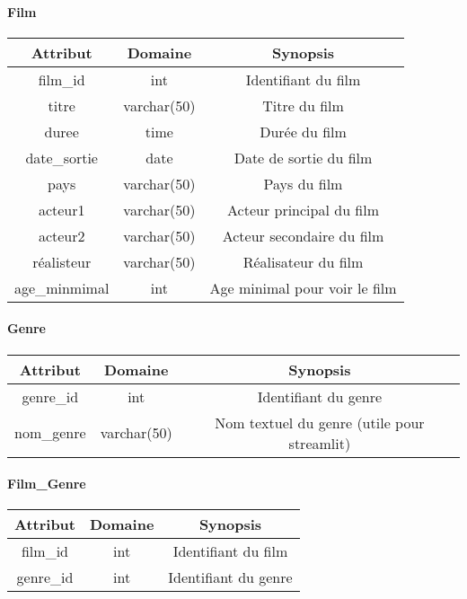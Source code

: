 \documentclass[12pt]{article}
\begin{document}
\paragraph*{Film}
\begin{center}
    \begin{tabular}{||c c c||} 
     \hline
     Attribut & Domaine & Synopsis\\ [0.5ex] 
     \hline\hline
     {\color{blue} film{\_}id} & int & Identifiant du film \\ 
     \hline
     titre & varchar(50) & Titre du film \\
     \hline
     duree & time & Durée du film \\
     \hline
     date{\_}sortie & date & Date de sortie du film \\
     \hline
     pays & varchar(50) & Pays du film \\
     \hline
     acteur1 & varchar(50) & Acteur principal du film \\
     \hline
     acteur2 & varchar(50) & Acteur secondaire du film \\
     \hline
     réalisteur & varchar(50) & Réalisateur du film \\
     \hline
     age{\_}minmimal & int & Age minimal pour voir le film \\
     \hline
    \end{tabular}
\end{center}
\paragraph*{Genre}
\begin{center}
    \begin{tabular}{||c c c||} 
     \hline
     Attribut & Domaine & Synopsis\\ [0.5ex] 
     \hline\hline
     {\color{blue} genre{\_}id} & int & Identifiant du genre \\ 
     \hline
     nom{\_}genre & varchar(50) & Nom textuel du genre (utile pour streamlit) \\
     \hline
    \end{tabular}
\end{center}
\paragraph*{Film{\_}Genre}
\begin{center}
    \begin{tabular}{||c c c||} 
     \hline
     Attribut & Domaine & Synopsis\\ [0.5ex] 
     \hline\hline
     {\color{blue}film\_id} & int & Identifiant du film \\ 
     \hline
     {\color{blue}genre{\_}id} & int & Identifiant du genre \\
     \hline
    \end{tabular}
\end{center}
\pagebreak
\end{document}
